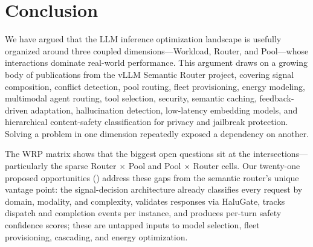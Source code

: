 \section{Conclusion}
\label{sec:conclusion}

We have argued that the LLM inference optimization landscape is
usefully organized around three coupled dimensions---Workload, Router,
and Pool---whose interactions dominate real-world performance.  This
argument draws on a growing body of publications from the vLLM Semantic Router
project, covering signal composition, conflict detection, pool
routing, fleet provisioning, energy modeling, multimodal agent
routing, tool selection, security, semantic caching,
feedback-driven adaptation, hallucination detection,
low-latency embedding models, and hierarchical content-safety
classification for privacy and jailbreak protection.  Solving a problem in one dimension repeatedly exposed a dependency
on another.

The WRP matrix shows that the biggest open questions sit at the
intersections---particularly the sparse Router $\times$ Pool and
Pool $\times$ Router cells.  Our twenty-one proposed opportunities
() address these gaps from the semantic router's
unique vantage point: the signal-decision architecture already
classifies every request by domain, modality, and complexity,
validates responses via HaluGate, tracks dispatch and completion
events per instance, and produces per-turn safety confidence
scores; these are untapped inputs to model selection, fleet
provisioning, cascading, and energy optimization.

